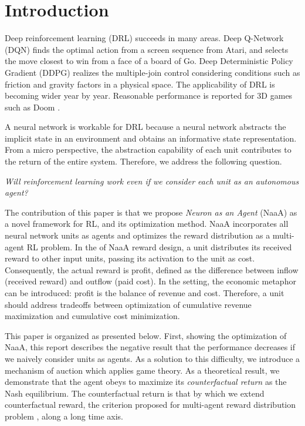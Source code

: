 \section{Introduction}
Deep reinforcement learning (DRL) succeeds in many areas.
Deep Q-Network (DQN) \citep{mnih2015human,silver2016mastering} finds the optimal action from a screen sequence from Atari, and selects the move closest to win from a face of a board of Go.
Deep Deterministic Policy Gradient (DDPG) \citep{lillicrap2015continuous} realizes the multiple-join control considering conditions such as friction and gravity factors in a physical space.
The applicability of DRL is becoming wider year by year. Reasonable performance is reported for 3D games such as Doom \citep{dosovitskiy2016learning}.

A neural network is workable for DRL because a neural network abstracts the implicit state in an environment and obtains an informative state representation.
From a micro perspective, the abstraction capability of each unit contributes to the return of the entire system.
Therefore, we address the following question.

\begin{center}
{\em Will reinforcement learning work even if we consider each unit as an autonomous agent?}
\end{center}

The contribution of this paper is that we propose {\em Neuron as an Agent} (NaaA) as a novel framework for RL, and its optimization method.
NaaA incorporates all neural network units as agents and optimizes the reward distribution as a multi-agent RL problem.
In the of NaaA reward design, a unit distributes its received reward to other input units, passing its activation to the unit as cost.
Consequently, the actual reward is profit, defined as the difference between inflow (received reward) and outflow (paid cost).
In the setting, the economic metaphor can be introduced: profit is the balance of revenue and cost. 
Therefore, a unit should address tradeoffs between optimization of cumulative revenue maximization and cumulative cost minimization.

This paper is organized as presented below.
First, showing the optimization of NaaA, this report describes the negative result that the performance decreases if we naively consider units as agents.
As a solution to this difficulty, we introduce a mechanism of auction which applies game theory.
As a theoretical result, we demonstrate that the agent obeys to maximize its {\em counterfactual return} as the Nash equilibrium.
The counterfactual return is that by which we extend counterfactual reward, the criterion proposed for multi-agent reward distribution problem \citep{agogino2006quicr}, along a long time axis.

